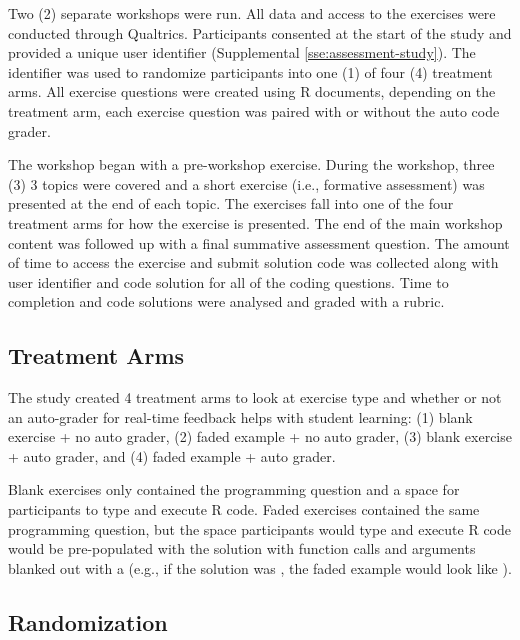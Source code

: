 \documentclass[040-assessment.tex]{subfiles}
\begin{document}
Two (2) separate workshops were run.
All data and access to the exercises were conducted through Qualtrics.
Participants consented at the start of the study and provided a unique user identifier
(Supplemental \ref{sse:assessment-study}).
The identifier was used to randomize participants into one (1) of four (4) treatment arms.
All exercise questions were created using R  documents,
depending on the treatment arm, each exercise question was paired with or without
the  auto code grader.

The workshop began with a pre-workshop exercise.
During the workshop, three (3) 3 topics were covered and a short exercise (i.e., formative assessment)
was presented at the end of each topic.
The exercises fall into one of the four treatment arms for how the exercise is presented.
The end of the main workshop content was followed up with a final summative assessment question.
The amount of time to access the exercise and submit solution code was collected
along with user identifier and code solution for all of the coding questions.
Time to completion and code solutions were analysed and graded with a rubric.

\subsection{Treatment Arms}

    The study created 4 treatment arms to look at exercise type and whether or not an auto-grader for
    real-time feedback helps with student learning:
    (1) blank exercise + no auto grader,
    (2) faded example + no auto grader,
    (3) blank exercise + auto grader, and
    (4) faded example + auto grader.

    Blank exercises only contained the programming question and a space for participants to type and execute R code.
    Faded exercises contained the same programming question,
    but the space participants would type and execute R code would be pre-populated with the solution with
    function calls and arguments blanked out with a \code{\_\_}
    (e.g., if the solution was ,
    the faded example would look like \code{\_\_(\_\_)} ).

\subsection{Randomization}
\end{document}
